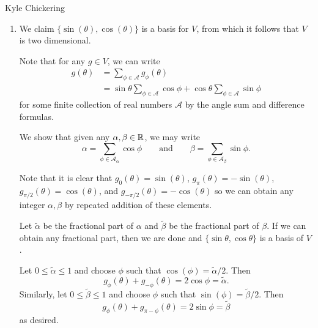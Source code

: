 \begin{solution}{Kyle Chickering}
	\begin{enumerate}[label=(\alph*)]
            \item 
                We claim $\{\sin(\theta),\cos(\theta)\}$ is a basis for $V$, from which it follows that $V$ is two dimensional.

                Note that for any $g\in V$, we can write
                \begin{align*}
                    g(\theta) &= \sum_{\phi\in \mathcal{A}}g_{\phi}(\theta)	\\
                              &= \sin\theta\sum_{\phi\in \mathcal{A}}\cos\phi + \cos\theta\sum_{\phi\in \mathcal{A}}\sin\phi
                \end{align*}
                for some finite collection of real numbers $\mathcal{A}$ by the angle sum and difference formulas.

                We show that given any $\alpha,\beta\in \mathbb{R}$, we may write
                \[ \alpha = \sum_{\phi\in \mathcal{A}_\alpha}\cos\phi \qquad \text{and} \qquad \beta = \sum_{\phi\in \mathcal{A}_\beta}\sin\phi. \]

                Note that it is clear that $g_0(\theta)=\sin(\theta)$, $g_\pi(\theta)=-\sin(\theta)$, $g_{\pi/2}(\theta) = \cos(\theta)$, and $g_{-\pi/2}(\theta)=-\cos(\theta)$ so we can obtain any integer $\alpha,\beta$ by repeated addition of these elements.

                Let $\tilde \alpha$ be the fractional part of $\alpha$ and $\tilde \beta$ be the fractional part of $\beta$.
                If we can obtain any fractional part, then we are done and $\{\sin\theta, \cos\theta\}$ is a basis of $V$.

                Let $0 \leqslant \tilde \alpha\leqslant 1$ and choose $\phi$ such that $\cos(\phi)=\tilde \alpha/2$.
                Then
                \[ g_\phi(\theta) + g_{-\phi}(\theta) = 2\cos\phi = \tilde \alpha. \]
                Similarly, let $0 \leqslant \tilde \beta \leqslant 1$ and choose $\phi$ such that $\sin(\phi)=\tilde \beta/2$.
                Then
                \[ g_\phi(\theta) + g_{\pi-\phi}(\theta) = 2\sin\phi = \tilde \beta \]
                as desired.

        \end{enumerate}
\end{solution}

